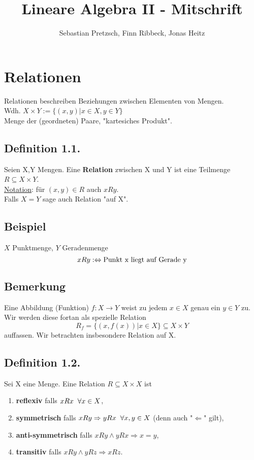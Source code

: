\documentclass[a4paper, 12pt]{extarticle}
\newcommand{\tn}[1]{\textnormal {#1}}
\begin{document}
\title{Lineare Algebra II - Mitschrift}
\author{Sebastian Pretzsch, Finn Ribbeck, Jonas Heitz}
\maketitle
\section{Relationen}
Relationen beschreiben Beziehungen zwischen Elementen von Mengen. \\
Wdh. $X{\times}Y := \{(x,y) | x \in X, y \in Y\}$ \\
Menge der (geordneten) Paare, "kartesiches Produkt".

\subsection*{Definition 1.1.}
Seien X,Y Mengen. Eine \textbf{Relation} zwischen X und Y ist eine Teilmenge $R \subseteq X{\times}Y$. \\
\underline{Notation}: für $(x,y)\in R$ auch $xRy$. \\
Falls $X=Y$ sage auch Relation "auf X".

\subsection*{Beispiel}
$X$ Punktmenge, $Y$ Geradenmenge
$$xRy :\Leftrightarrow \tn{Punkt x liegt auf Gerade y}$$

\subsection*{Bemerkung}
Eine Abbildung (Funktion) $f:X{\to}Y$ weist zu jedem $x\in X$ genau ein $
y\in Y$ zu. \\
Wir werden diese fortan als spezielle Relation
$$R_f = \{(x, f(x)) | x\in X\} \subseteq X{\times}Y$$
auffassen. Wir betrachten insbesondere Relation auf X.

\subsection*{Definition 1.2.}
Sei X eine Menge. Eine Relation $R \subseteq X{\times}X$ ist
\begin{enumerate}[label=(\alph*)]
\item \textbf{reflexiv} falls $xRx \hspace*{2mm}\forall x\in X$,
\item \textbf{symmetrisch} falls $xRy \Rightarrow yRx \hspace*{2mm}\forall x,y\in X$ (denn auch "$\Leftarrow$" gilt),
\item \textbf{anti-symmetrisch} falls $xRy \land yRx \Rightarrow x=y$,
\item \textbf{transitiv} falls $xRy \land yRz \Rightarrow xRz$.
\end{enumerate}
\end{document}
